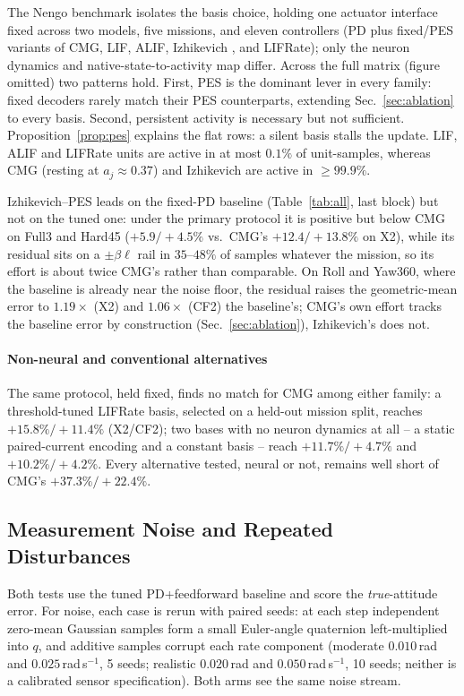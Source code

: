 \documentclass[letterpaper, 10 pt, conference]{ieeeconf}
\begin{document}
The Nengo benchmark isolates the basis choice, holding one actuator interface fixed across two models, five missions, and eleven controllers (PD plus fixed/PES variants of CMG, LIF, ALIF, Izhikevich \cite{izhikevich2003}, and LIFRate); only the neuron dynamics and native-state-to-activity map differ. Across the full matrix (figure omitted) two patterns hold. First, PES is the dominant lever in every family: fixed decoders rarely match their PES counterparts, extending Sec.~\ref{sec:ablation} to every basis. Second, persistent activity is necessary but not sufficient. Proposition~\ref{prop:pes} explains the flat rows: a silent basis stalls the update. LIF, ALIF and LIFRate units are active in at most $0.1\%$ of unit-samples, whereas CMG (resting at $a_j\approx0.37$) and Izhikevich are active in ${\ge}99.9\%$.

Izhikevich--PES leads on the fixed-PD baseline (Table~\ref{tab:all}, last block) but not on the tuned one: under the primary protocol it is positive but below CMG on Full3 and Hard45 ($+5.9/+4.5\%$ vs.\ CMG's $+12.4/+13.8\%$ on X2), while its residual sits on a $\pm\beta\ell$ rail in $35$--$48\%$ of samples whatever the mission, so its effort is about twice CMG's rather than comparable. On Roll and Yaw360, where the baseline is already near the noise floor, the residual raises the geometric-mean error to $1.19\times$ (X2) and $1.06\times$ (CF2) the baseline's; CMG's own effort tracks the baseline error by construction (Sec.~\ref{sec:ablation}), Izhikevich's does not.

\paragraph{Non-neural and conventional alternatives} The same protocol, held fixed, finds no match for CMG among either family: a threshold-tuned LIFRate basis, selected on a held-out mission split, reaches $+15.8\%/+11.4\%$ (X2/CF2); two bases with no neuron dynamics at all -- a static paired-current encoding and a constant basis -- reach $+11.7\%/+4.7\%$ and $+10.2\%/+4.2\%$. Every alternative tested, neural or not, remains well short of CMG's $+37.3\%/+22.4\%$.

\subsection{Measurement Noise and Repeated Disturbances}
\label{sec:noise}
Both tests use the tuned PD+feedforward baseline and score the \emph{true}-attitude error. For noise, each case is rerun with paired seeds: at each step independent zero-mean Gaussian samples form a small Euler-angle quaternion left-multiplied into $q$, and additive samples corrupt each rate component (moderate $0.010$\,rad and $0.025$\,rad\,s$^{-1}$, 5 seeds; realistic $0.020$\,rad and $0.050$\,rad\,s$^{-1}$, 10 seeds; neither is a calibrated sensor specification). Both arms see the same noise stream.
\end{document}
